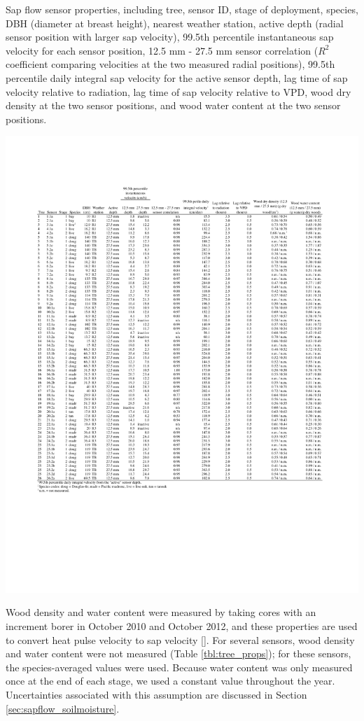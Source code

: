 \begin{table}
  \caption{Sap flow sensor properties, including tree, sensor ID, stage of deployment, species, DBH (diameter at breast height), nearest weather station, active depth (radial sensor position with larger sap velocity), 99.5th percentile instantaneous sap velocity for each sensor position, 12.5 mm - 27.5 mm sensor correlation ($R^2$ coefficient comparing velocities at the two measured radial positions), 99.5th percentile daily integral sap velocity for the active sensor depth, lag time of sap velocity relative to radiation, lag time of sap velocity relative to VPD, wood dry density at the two sensor positions, and wood water content at the two sensor positions.}
  \label{tbl:tree_props}
  \includegraphics[width=\linewidth]{ch1-sapflow/tables/Table1.pdf}
\end{table}

Wood density and water content were measured by taking cores with an increment borer in October 2010 and October 2012, and these properties are used to convert heat pulse velocity to sap velocity [\cite{burgess2001improved}].  For several sensors, wood density and water content were not measured (Table \ref{tbl:tree_props}); for these sensors, the species-averaged values were used.  Because water content was only measured once at the end of each stage, we used a constant value throughout the year.  Uncertainties associated with this assumption are discussed in Section \ref{sec:sapflow_soilmoisture}.

